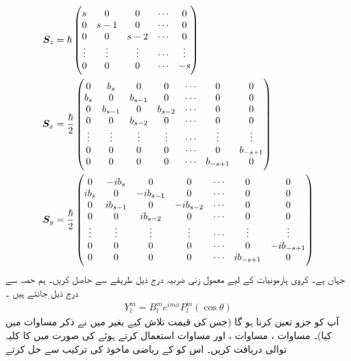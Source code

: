 \begin{align*}
    {\ensuremath{{\boldsymbol{S}}}}_z&=\hslash \begin{pmatrix}
    s&0&0&\cdots&0\\0&s-1&0&\cdots&0\\0&0&s-2&\cdots&0\\\vdots&\vdots&\vdots&\cdots&\vdots\\0&0&0&\cdots&-s
    \end{pmatrix} \\ 
    {{\boldsymbol{S}}}_x&=\frac{\hslash}{2}\begin{pmatrix}0&b_s&0&0&\cdots&0&0\\b_s&0&b_{s-1}&0&\cdots&0&0\\0&b_{s-1}&0&b_{s-2}&\cdots&0&0\\0&0&b_{s-2}&0&\cdots&0&0\\\vdots&\vdots&\vdots&\vdots&\cdots&\vdots&\vdots\\0&0&0&0&\cdots&0&b_{-s+1}\\0&0&0&0&\cdots&b_{-s+1}&0\end{pmatrix} \\
    {{\boldsymbol{S}}}_y&=\frac{\hslash}{2}\begin{pmatrix}0&-i b_s&0&0&\cdots&0&0\\i b_s&0&-i b_{s-1}&0&\cdots&0&0\\0&i b_{s-1}&0&-i b_{s-2}&\cdots&0&0\\0&0&i b_{s-2}&0&\cdots&0&0\\\vdots&\vdots&\vdots&\vdots&\cdots&\vdots&\vdots\\0&0&0&0&\cdots&0&-i b_{-s+1}\\0&0&0&0&\cdots&i b_{-s+1}&0
    \end{pmatrix}
\end{align*} 
جہاں    ہے۔
کروی ہارمونیات کے لیے معمول زنی  ضربیہ  درج ذیل طریقے سے حاصل کریں۔ ہم حصہ سے درج ذیل جانتے ہیں ۔
\begin{align*} 
    Y_{l}^{m}=B_{    l}^{m}e^{i m\phi}P_{l}    ^{m}(\cos\theta)
\end{align*} 
آپ کو جزو   تعین کرنا ہو گا (جس کی قیمت تلاش کیے بغیر میں نے ذکر مساوات     میں کیا)۔ مساوات ، مساوات ،   اور مساوات   استعمال کرتے ہوئے    کی صورت  میں    کا کلیہ توالی دریافت کریں۔ اس کو  کے ریاضی ماخوذ  کی ترکیب سے حل کرتے
